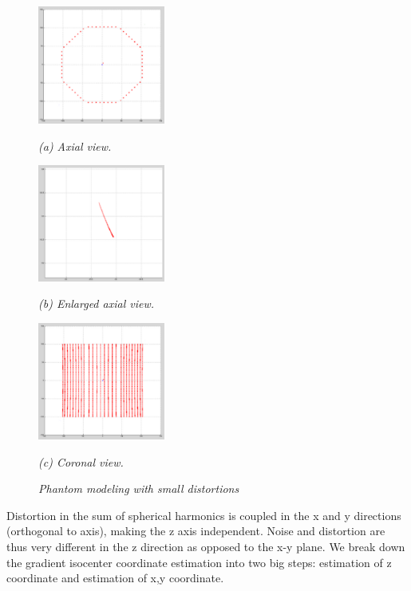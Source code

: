 \begin{figure}[htb]

  \begin{minipage}[b]{0.48\linewidth}
    \centering
    \centerline{\mbox{\includegraphics[width=1.65in]{isocenter/images/simulation/axial_distortion_1.eps}}}
    \centerline{\emph{(a) Axial view.}}\medskip
  \end{minipage}
  \hfill
  \begin{minipage}[b]{0.48\linewidth}
    \centering
    \centerline{\mbox{\includegraphics[width=1.65in]{isocenter/images/simulation/axial_tube_distortion_1.eps}}}
    \centerline{\emph{(b) Enlarged axial view.}}\medskip
  \end{minipage}
  \begin{minipage}[b]{0.48\linewidth}
    \centering
    \centerline{\mbox{\includegraphics[width=1.65in]{isocenter/images/simulation/coronal_distortion_1.eps}}}
    \centerline{\emph{(c) Coronal view.}}\medskip
  \end{minipage}
%
\caption{\emph{Phantom modeling with small distortions}} \label{fig:3}
%
\end{figure}



Distortion in the sum of spherical harmonics is coupled in the x and y directions (orthogonal to axis), making the z axis independent.  Noise and distortion are thus very different in the z direction as opposed to the x-y plane.  We break down the gradient isocenter coordinate estimation into two big steps: estimation of z coordinate and estimation of x,y coordinate.

